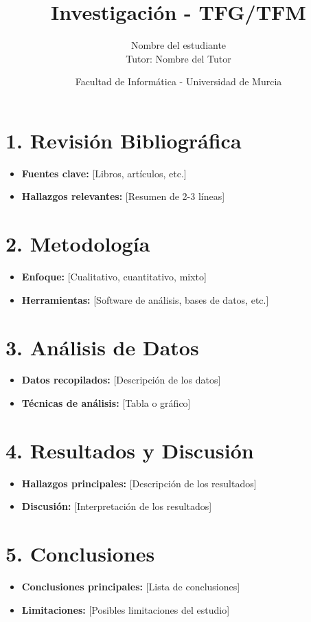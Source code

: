 \documentclass[12pt, a4paper]{article}
\title{\textbf{Investigación - TFG/TFM}}
\author{Nombre del estudiante \\ Tutor: Nombre del Tutor}
\date{Facultad de Informática - Universidad de Murcia}
\begin{document}
\maketitle

\section*{1. Revisión Bibliográfica}
\begin{itemize}
    \item \textbf{Fuentes clave:} [Libros, artículos, etc.]
    \item \textbf{Hallazgos relevantes:} [Resumen de 2-3 líneas]
\end{itemize}

\section*{2. Metodología}
\begin{itemize}
    \item \textbf{Enfoque:} [Cualitativo, cuantitativo, mixto]
    \item \textbf{Herramientas:} [Software de análisis, bases de datos, etc.]
\end{itemize}

\section*{3. Análisis de Datos}
\begin{itemize}
    \item \textbf{Datos recopilados:} [Descripción de los datos]
    \item \textbf{Técnicas de análisis:} [Tabla o gráfico]
\end{itemize}

\section*{4. Resultados y Discusión}
\begin{itemize}
    \item \textbf{Hallazgos principales:} [Descripción de los resultados]
    \item \textbf{Discusión:} [Interpretación de los resultados]
\end{itemize}

\section*{5. Conclusiones}
\begin{itemize}
    \item \textbf{Conclusiones principales:} [Lista de conclusiones]
    \item \textbf{Limitaciones:} [Posibles limitaciones del estudio]
\end{itemize}
\end{document}
